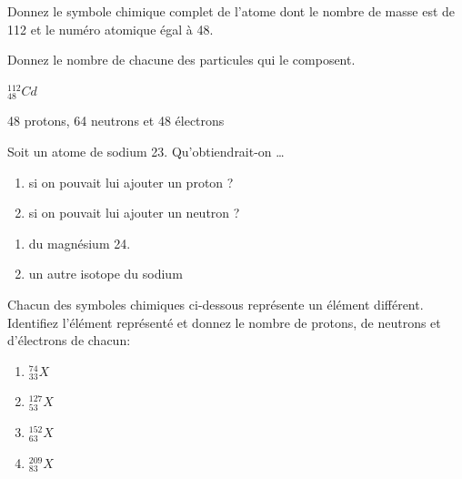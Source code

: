 \documentclass[
  11pt,
  french,
  a4paper,
  openany]{book}
\providecommand{\tightlist}{%
  \setlength{\itemsep}{0pt}\setlength{\parskip}{0pt}}
\begin{document}
\begin{Exercise}

Donnez le symbole chimique complet de l'atome dont le nombre de masse est de 112 et le numéro atomique égal à 48.


Donnez le nombre de chacune des particules qui le composent.



\end{Exercise}

\begin{Answer}
\(_{48}^{112}Cd\)

48 protons, 64 neutrons et 48 électrons

\end{Answer}

\begin{Exercise}

Soit un atome de sodium 23. Qu'obtiendrait-on \ldots{}

\begin{enumerate}
\def\labelenumi{\arabic{enumi}.}
\tightlist
\item
  si on pouvait lui ajouter un proton ?\\
\item
  si on pouvait lui ajouter un neutron ?\\
\end{enumerate}


\end{Exercise}

\begin{Answer}

\begin{enumerate}
\def\labelenumi{\arabic{enumi}.}
\tightlist
\item
  du magnésium 24.
\item
  un autre isotope du sodium
\end{enumerate}


\end{Answer}

\newpage

\begin{Exercise}

Chacun des symboles chimiques ci-dessous représente un élément différent. Identifiez l'élément représenté et donnez le nombre de protons, de neutrons et d'électrons de chacun:

\begin{enumerate}
\def\labelenumi{\arabic{enumi}.}
\tightlist
\item
  \(^{74}_{33}X\)\\
\item
  \(^{127}_{53}X\)\\
\item
  \(^{152}_{63}X\)\\
\item
  \(^{209}_{83}X\)
\end{enumerate}


\end{Exercise}
\end{document}
